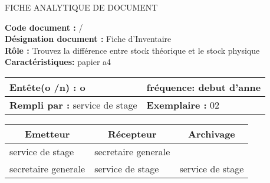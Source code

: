 

\newpage

\begin{center}
\Huge FICHE ANALYTIQUE DE DOCUMENT
\end{center}

\vspace{0.5cm}
    

\begin{flushleft}
\textbf{Code document :} / \\
\textbf{Désignation document :} Fiche d'Inventaire \\
\textbf{Rôle :} Trouvez la différence entre stock théorique et le stock physique \\
\textbf{Caractéristiques:} papier a4 \\
\end{flushleft}

\vspace{1cm}

\begin{table}[ht]
\begin{tabularx}{\textwidth}{|X|X|}

\hline
\textbf{Entête(o /n) :}  o   & \textbf{fréquence:} debut d'anne  \\
\hline
\textbf{Rempli par :}  service de stage    & \textbf{Exemplaire :} 02  \\
\hline
\end{tabularx}
\end{table}

\vspace{1cm}

\begin{table}[ht]
\begin{tabularx}{\textwidth}{|X|X|X|}
  \hline
  \multicolumn{1}{|c|}{\centering\textbf{Emetteur}} & \multicolumn{1}{c|}{\centering\textbf{Récepteur}} & \multicolumn{1}{c|}{\centering\textbf{Archivage}} \\
  \hline
  service de stage & secretaire generale &  \\
 secretaire generale & service de stage & service de stage \\
  \hline
\end{tabularx}
\end{table}

\vspace{1cm}


